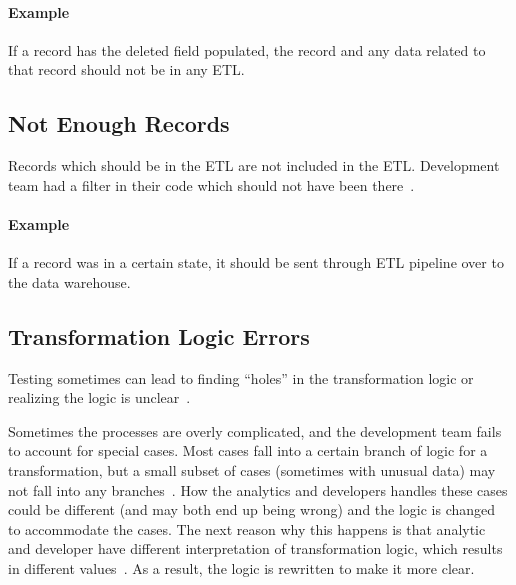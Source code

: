 \paragraph*{Example} If a record has the deleted field populated, the record and any data related to that record should not be in any ETL.


\subsection*{Not Enough Records}

Records which should be in the ETL are not included in the ETL.
Development team had a filter in their code which should not have been there~\cite{web:common-defects}.

\paragraph*{Example} If a record was in a certain state, it should be sent through ETL pipeline over to the data warehouse.


\subsection*{Transformation Logic Errors}

Testing sometimes can lead to finding \enquote{holes} in the transformation logic or realizing the logic is unclear~\cite{web:common-defects}.

Sometimes the processes are overly complicated, and the development team fails to account for special cases.
Most cases fall into a certain branch of logic for a transformation, but a small subset of cases (sometimes with unusual data) may not fall into any branches~\cite{web:common-defects}.
How the analytics and developers handles these cases could be different (and may both end up being wrong) and the logic is changed to accommodate the cases.
The next reason why this happens is that analytic and developer have different interpretation of transformation logic, which results in different values~\cite{web:common-defects}.
As a result, the logic is rewritten to make it more clear.

